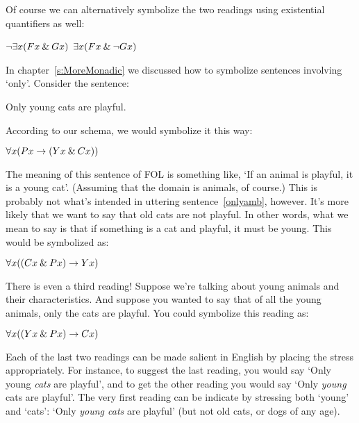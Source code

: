 Of course we can alternatively symbolize the two readings using existential quantifiers as well:
\begin{earg}
	\prem $\neg\exists x(F{x} \mathbin{\&} {G}{x})$
	\prem $\exists x(F{x} \mathbin{\&} \neg {G}{x})$
\end{earg}

In chapter~\ref{s:MoreMonadic} we discussed how to symbolize sentences involving `only'. Consider the sentence:
\begin{earg}
	\item[\ex{onlyamb}] Only young cats are playful.
\end{earg}
According to our schema, we would symbolize it this way:
\begin{earg}
	\prem $\forall x({P}{x} \rightarrow ({Y}{x} \mathbin{\&} {C}{x}))$
\end{earg}
The meaning of this sentence of FOL is something like, `If an animal is playful, it is a young cat'. (Assuming that the domain is animals, of course.) This is probably not what's intended in uttering sentence~\ref{onlyamb}, however. It's more likely that we want to say that old cats are not playful. In other words, what we mean to say is that if something is a cat and playful, it must be young. This would be symbolized as:
\begin{earg}
	\prem $\forall x(({C}{x} \mathbin{\&} {P}{x}) \rightarrow {Y}{x})$
\end{earg}
There is even a third reading! Suppose we're talking about young animals and their characteristics. And suppose you wanted to say that of all the young animals, only the cats are playful. You could symbolize this reading as:
\begin{earg}
	\prem $\forall x(({Y}{x} \mathbin{\&} {P}{x}) \rightarrow {C}{x})$
\end{earg}
Each of the last two readings can be made salient in English by placing the stress appropriately. For instance, to suggest the last reading, you would say `Only young \emph{cats} are playful', and to get the other reading you would say `Only \emph{young} cats are playful'.  The very first reading can be indicate by stressing both `young' and `cats': `Only \emph{young cats} are playful' (but not old cats, or dogs of any age).


